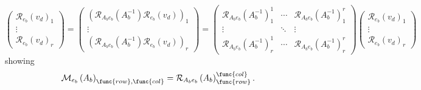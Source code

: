 \documentclass[aps,preprint]{revtex4}
\begin{document}
\begin{enumerate}
\begin{enumerate}
\begin{equation}
\left( 
\begin{array}{c}
\mathcal{R}_{e_{b}}\left( v_{d}\right) _{1} \\ 
\vdots \\ 
\mathcal{R}_{e_{b}}\left( v_{d}\right) _{r}%
\end{array}%
\right) =\left( 
\begin{array}{c}
\left( \mathcal{R}_{A_{b}e_{b}}\left( A_{b}^{-1}\right) \mathcal{R}%
_{e_{b}}\left( v_{d}\right) \right) _{1} \\ 
\vdots \\ 
\left( \mathcal{R}_{A_{b}e_{b}}\left( A_{b}^{-1}\right) \mathcal{R}%
_{e_{b}}\left( v_{d}\right) \right) _{r}%
\end{array}%
\right) =\left( 
\begin{array}{ccc}
\mathcal{R}_{A_{b}e_{b}}\left( A_{b}^{-1}\right) _{1}^{1} & \cdots & 
\mathcal{R}_{A_{b}e_{b}}\left( A_{b}^{-1}\right) _{1}^{r} \\ 
\vdots & \ddots & \vdots \\ 
\mathcal{R}_{A_{b}e_{b}}\left( A_{b}^{-1}\right) _{r}^{1} & \cdots & 
\mathcal{R}_{A_{b}e_{b}}\left( A_{b}^{-1}\right) _{r}^{r}%
\end{array}%
\right) \left( 
\begin{array}{c}
\mathcal{R}_{e_{b}}\left( v_{d}\right) _{1} \\ 
\vdots \\ 
\mathcal{R}_{e_{b}}\left( v_{d}\right) _{r}%
\end{array}%
\right)
\end{equation}%
showing 
\begin{equation}
\mathcal{M}_{e_{b}}\left( A_{b}\right) _{\func{row},\func{col}}=\mathcal{R}%
_{A_{b}e_{b}}\left( A_{b}\right) _{\func{row}}^{\func{col}}.
\end{equation}


\end{enumerate}
\end{enumerate}
\end{document}
